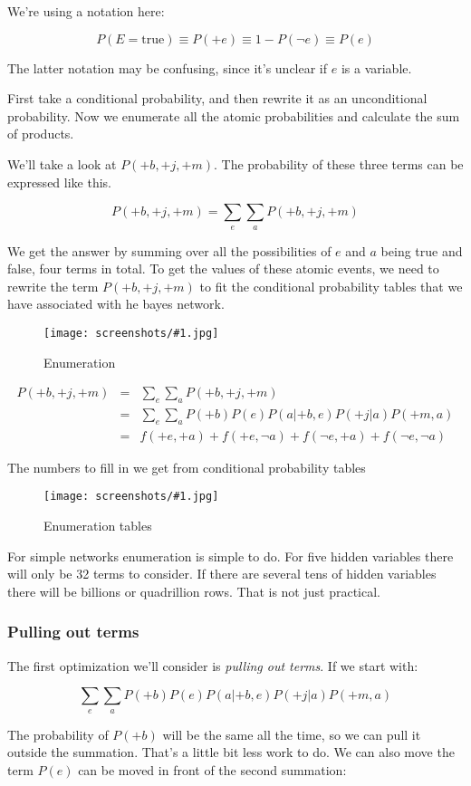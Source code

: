 \documentclass[a4, 12pt, english, USenglish]{scrreprt}
\newcommand{\screenshot}[2]{
\begin{figure}[htb]
\texttt{[image: screenshots/\#1.jpg]}
\label{#1}
\caption{#2}
\end{figure}}
\newcommand{\idx}[1]{{\em #1}\index{#1}}
\begin{document}
We're using a notation here:

\[
P(E=\mbox{true}) \equiv  P(+e) \equiv 1 - P(\neg e) \equiv P(e)
\]

The latter notation may be confusing, since it's unclear if \(e\) is a variable.

First take a conditional probability, and then rewrite it as an
unconditional probability.  Now we enumerate all the atomic
probabilities and calculate the sum of products.

We'll take a look at \(P(+b, +j, +m) \).  The probability of these
three terms can be expressed like this.

\[
  P(+b, +j, +m)   = \sum_e \sum_a P(+b, +j, +m)
\]

We get the answer by summing over all the possibilities of \(e\) and \(a\)
being true and false, four terms in total.   To get the values of
these  atomic events, we need to rewrite the term \(P(+b, +j, +m)\) to
fit the  conditional probability tables that we have associated with
he bayes network.

\screenshot{enumeration}{Enumeration}


\[ 
\begin{array}{lcl}
  P(+b, +j, +m)   &=&  \sum_e \sum_a P(+b, +j, +m) \\
&=& \sum_e \sum_a P(+b)P(e) P(a|+b, e) P(+j|a) P(+m, a) \\
&=& f(+e,+a)  + f(+e,\neg a) + f(\neg e,+a) + f(\neg e, \neg a)
\end{array}
\]

The numbers to fill in we get from conditional probability tables


\screenshot{enumerationtables}{Enumeration tables}



For simple networks enumeration is simple to do.  For five hidden variables
there will only be 32 terms to consider.   If there are several tens of
hidden variables there will be billions or quadrillion rows.  That is
not just practical.  

\subsubsection{Pulling out terms}

The first optimization we'll consider is \idx{pulling out terms}.  If
we start with:

\[
  \sum_e \sum_a P(+b)P(e) P(a|+b, e) P(+j|a) P(+m, a)
\]

The probability of   \(P(+b)\) will be the same all the time, so we
can pull it outside the summation.  That's a little bit less work to
do.   We can also move the term \(P(e)\)  can be moved in front of the
second summation: 
\end{document}
